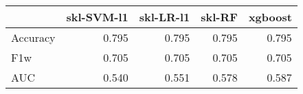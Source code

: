 \begin{tabular}{lrrrr}
\toprule
{} &  skl-SVM-l1 &  skl-LR-l1 &  skl-RF &  xgboost \\
\midrule
Accuracy &       0.795 &      0.795 &   0.795 &    0.795 \\
F1w      &       0.705 &      0.705 &   0.705 &    0.705 \\
AUC      &       0.540 &      0.551 &   0.578 &    0.587 \\
\bottomrule
\end{tabular}
